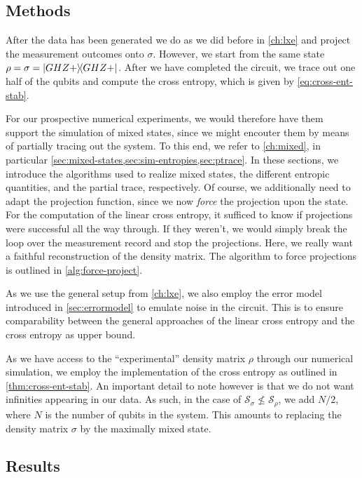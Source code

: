 \subsection{Methods}
After the data has been generated we do as we did before in \cref{ch:lxe} and
project the measurement outcomes onto $\sigma$. However, we start from the same
state $\rho = \sigma = \dyad{GHZ+}$. After we have completed the circuit, we
trace out one half of the qubits and compute the cross entropy, which is given
by \cref{eq:cross-ent-stab}. 

For our prospective numerical experiments, we would therefore have them support
the simulation of mixed states, since we might encouter them by means of
partially tracing out the system. To this end, we refer to \cref{ch:mixed}, in
particular \cref{sec:mixed-states,sec:sim-entropies,sec:ptrace}. In these
sections, we introduce the algorithms used to realize mixed states, the
different entropic quantities, and the partial trace, respectively. Of course,
we additionally need to adapt the projection function, since we now
\emph{force} the projection upon the state. For the computation of the linear
cross entropy, it sufficed to know if projections were successful all the way
through. If they weren't, we would simply break the loop over the measurement
record and stop the projections. Here, we really want a faithful reconstruction
of the density matrix. The algorithm to force projections is outlined in
\cref{alg:force-project}.

As we use the general setup from \cref{ch:lxe}, we also employ the error model
introduced in \cref{sec:errormodel} to emulate noise in the circuit. This is to
ensure comparability between the general approaches of the linear cross entropy
and the cross entropy as upper bound.

As we have access to the \enquote{experimental} density matrix $\rho$ through
our numerical simulation, we employ the implementation of the cross entropy as
outlined in \cref{thm:cross-ent-stab}. An important detail to note however is
that we do not want infinities appearing in our data. As such, 
in the case of $\mathcal{S}_\sigma \not\leq
\mathcal{S}_\rho$, we add $N /2$, where $N$ is the number of qubits in the
system. This amounts to replacing the density matrix $\sigma$ by the maximally
mixed state.

\subsection{Results}

